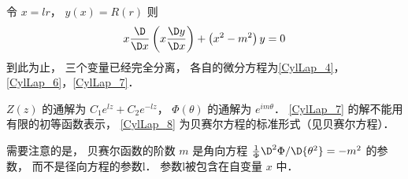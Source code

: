 令 $x = lr$，   $y\left( x \right) = R\left( r \right)$ 则
\begin{equation}\label{CylLap_8} 
x\frac{\D }{{\D x}}\left( {x\frac{{\D y}}{{\D x}}} \right) + \left( {{x^2} - {m^2}} \right)y = 0
\end{equation}
到此为止， 三个变量已经完全分离， 各自的微分方程为\autoref{CylLap_4}， \autoref{CylLap_6}，\autoref{CylLap_7}．

$Z\left( z \right)$ 的通解为 ${C_1}{e^{lz}} + {C_2}{e^{ - lz}}$，   $\Phi \left( \theta  \right)$ 的通解为 ${e^{im\theta }}$．   \autoref{CylLap_7} 的解不能用有限的初等函数表示， \autoref{CylLap_8} 为贝赛尔方程的标准形式（见贝赛尔方程）．

需要注意的是， 贝赛尔函数的阶数 $m$ 是角向方程 $\frac{1}{\Phi }{{{\D^2}\Phi }}/{{\D{\theta ^2}}} =  - {m^2}$ 的参数， 而不是径向方程的参数l． 参数l被包含在自变量 $x$ 中．
 
